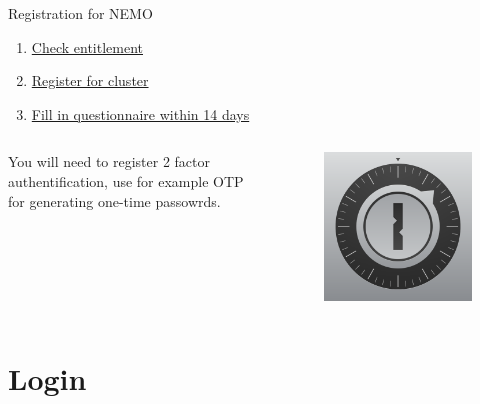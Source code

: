 \documentclass{beamer}
\begin{document}
\begin{frame}{Registration for NEMO}


\begin{enumerate}
    \item \href{https://wiki.bwhpc.de/e/Registration/bwUniCluster/Entitlement}{Check entitlement}
    \item \href{https://wiki.bwhpc.de/e/Registration/bwUniCluster/Service}{Register for cluster}
    \item \href{https://wiki.bwhpc.de/e/Registration/bwUniCluster/Questionnaire}{Fill in questionnaire within 14 days}
    
\end{enumerate}

\vspace{2cm}

\begin{columns}[onlytextwidth] 
  \begin{column}{0.5\textwidth}
      You will need to register 2 factor authentification, use for example OTP for generating one-time passowrds.
      \end{column}
    \hspace{0.02\textwidth} %
    \begin{column}{0.5\textwidth}
      \begin{figure}
        \centering
        \includegraphics[width=0.3\linewidth]{figures/OTP.png}
    \end{figure}
\end{column}
\end{columns}

  


\end{frame}


\section{Login}
\end{document}
